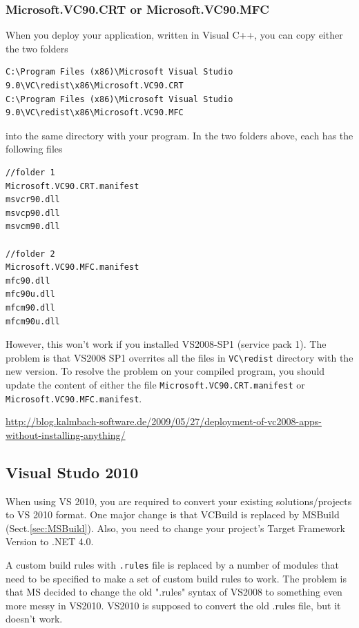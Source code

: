 \subsubsection{Microsoft.VC90.CRT or Microsoft.VC90.MFC}
\label{sec:deploy_CRT/MFC}

When you deploy your application, written in Visual C++, you can copy either the
two folders
\begin{verbatim}
C:\Program Files (x86)\Microsoft Visual Studio 9.0\VC\redist\x86\Microsoft.VC90.CRT
C:\Program Files (x86)\Microsoft Visual Studio 9.0\VC\redist\x86\Microsoft.VC90.MFC
\end{verbatim}
into the same directory with your program. In the two folders above, each has
the following files
\begin{verbatim}
//folder 1
Microsoft.VC90.CRT.manifest
msvcr90.dll
msvcp90.dll
msvcm90.dll

//folder 2
Microsoft.VC90.MFC.manifest
mfc90.dll
mfc90u.dll
mfcm90.dll
mfcm90u.dll
\end{verbatim}

However, this won't work if you installed VS2008-SP1 (service pack 1). The
problem is that VS2008 SP1 overrites all the files in \verb!VC\redist! directory
with the new version. To resolve the problem on your compiled program, you
should update the content of either the file 
\verb!Microsoft.VC90.CRT.manifest! or \verb!Microsoft.VC90.MFC.manifest!. 

\url{http://blog.kalmbach-software.de/2009/05/27/deployment-of-vc2008-apps-without-installing-anything/}

\subsection{Visual Studo 2010}
\label{sec:VS2010}

When using VS 2010, you are required to convert your existing solutions/projects
to VS 2010 format. One major change is that VCBuild is replaced by MSBuild
(Sect.\ref{sec:MSBuild}). Also, you need to change your project's Target
Framework Version to .NET 4.0.

A custom build rules with \verb!.rules! file is replaced by a number of modules
that need to be specified to make a set of custom build rules to work.
The problem is that MS decided to change the old ".rules" syntax of VS2008 to
something even more messy in VS2010. VS2010 is supposed to convert the old
.rules file, but it doesn't work.

